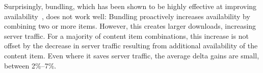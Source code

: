 \documentclass[10pt, conference, letterpaper]{IEEEtran}
\begin{document}
Surprisingly, bundling, which has been shown to be highly effective at improving availability~\cite{menasche2013content}, does not work well: Bundling proactively increases availability by combining two or more items.
However, this creates larger downloads, increasing server traffic. For a majority of content item combinations, this increase is not offset by the decrease in server traffic resulting from additional availability of the content item. Even where it saves server traffic, the average delta gains are small, between 2\%--7\%.  
\end{document}
